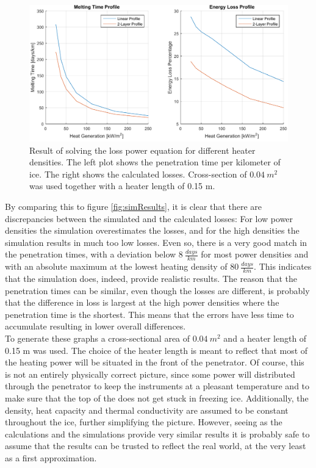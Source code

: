 \begin{figure}[ht]
	\centering
	\includegraphics[width=.9\textwidth]{figures/LAMC/verificationResult.pdf}
	\caption{Result of solving the loss power equation for different heater densities. The left plot shows the penetration time per kilometer of ice. The right shows the calculated losses. Cross-section of $\SI{0.04}{m^2}$ was used together with a heater length of 0.15 m.}
	\label{fig:verificationResult}
\end{figure}

\noindent
By comparing this to figure \ref{fig:simResults}, it is clear that there are discrepancies between the simulated and the calculated losses: For low power densities the simulation overestimates the losses, and for the high densities the simulation results in much too low losses. Even so, there is a very good match in the penetration times, with a deviation below $\SI{8}{\frac{days}{km}}$ for most power densities and with an absolute maximum at the lowest heating density of  $\SI{80}{\frac{days}{km}}$. This indicates that the simulation does, indeed, provide realistic results. The reason that the penetration times can be similar, even though the losses are different, is probably that the difference in loss is largest at the high power densities where the penetration time is the shortest. This means that the errors have less time to accumulate resulting in lower overall differences.\\

\noindent
To generate these graphs a cross-sectional area of $\SI{0.04}{m^2}$ and a heater length of 0.15 m was used. The choice of the heater length is meant to reflect that most of the heating power will be situated in the front of the penetrator. Of course, this is not an entirely physically correct picture, since some power will distributed through the penetrator to keep the instruments at a pleasant temperature and to make sure that the top of the does not get stuck in freezing ice. Additionally, the density, heat capacity and thermal conductivity are assumed to be constant throughout the ice, further simplifying the picture. However, seeing as the calculations and the simulations provide very similar results it is probably safe to assume that the results can be trusted to reflect the real world, at the very least as a first approximation.\\

